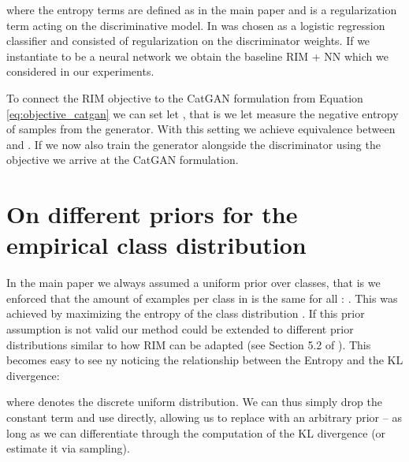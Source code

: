 \documentclass{article} \usepackage{iclr2016_conference,times}
\begin{document}
\begin{appendix}
where the entropy terms are defined as in the main paper and  is
a regularization term acting on the discriminative model. In
\citet{Krause_2010}  was chosen as a logistic regression classifier
and  consisted of  regularization on the discriminator
weights.  If we instantiate  to be a neural network we obtain the
baseline RIM + NN which we considered in our experiments.

To connect the RIM objective to the CatGAN formulation from Equation
\eqref{eq:objective_catgan} we can set let
,
that is we let  measure the negative entropy of samples from the
generator. With this setting we achieve equivalence between
 and . If we now also train the
generator  alongside the discriminator  using the objective
 we arrive at the CatGAN formulation.

\section{On different priors for the empirical class distribution}
In the main paper we always assumed a uniform prior over classes, that
is we enforced that the amount of examples per class in 
is the same for all :
. This was achieved
by maximizing the entropy of the class distribution
. If this prior
assumption is not valid our method could be extended to different
prior distributions  similar to how RIM can be adapted (see
Section 5.2 of \citet{Krause_2010}). This becomes easy to see ny
noticing the relationship between the Entropy and the KL divergence:

where  denotes the discrete uniform distribution. We can thus
simply drop the constant term  and use
 directly, allowing us to replace
 with an arbitrary prior  -- as long as we can
differentiate through the computation of the KL divergence (or
estimate it via sampling). 


\end{appendix}
\end{document}
